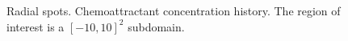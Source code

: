 \begin{figure}
\begin{center}
    \caption[Radial spots. Chemoattractant concentration history.]{Radial spots. Chemoattractant concentration history.  The region of interest is a $[-10,10]^2$ subdomain.\label{fig:bio_radial_spots_chemoattractant}}
  \end{center}
\end{figure}


